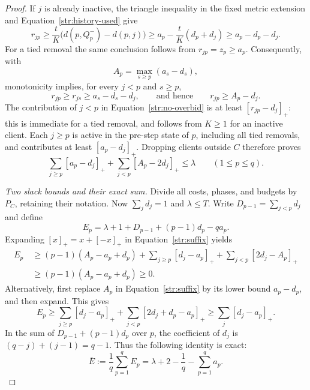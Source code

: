 \begin{proof}
If $j$ is already inactive, the triangle inequality in the fixed metric
extension and Equation~\eqref{str:history-used} give
\[
 r_{jp}\ge \frac{t}{K}\bigl(d(p,Q_p^-)-d(p,j)\bigr)
 \ge a_p-\frac{t}{K}(d_p+d_j)
 \ge a_p-d_p-d_j.
\]
For a tied removal the same conclusion follows from $r_{jp}=z_p\ge a_p$.
Consequently, with
\[
 A_p=\max_{s\ge p}(a_s-d_s),
\]
monotonicity implies, for every $j<p$ and $s\ge p$,
\[
 r_{jp}\ge r_{js}\ge a_s-d_s-d_j,
 \qquad\text{and hence}\qquad r_{jp}\ge A_p-d_j.
\]
The contribution of $j<p$ in Equation~\eqref{str:no-overbid} is at least
$[r_{jp}-d_j]_+$: this is immediate for a tied removal, and follows
from $K\ge1$ for an inactive client.  Each $j\ge p$ is active in the
pre-step state of $p$, including all tied removals, and contributes at
least $[a_p-d_j]_+$.  Dropping clients outside $C$ therefore proves
\begin{equation}\label{str:suffix}
 \sum_{j\ge p}[a_p-d_j]_+
 +\sum_{j<p}[A_p-2d_j]_+\le\lambda
 \qquad(1\le p\le q).
\end{equation}

\textit{Two slack bounds and their exact sum.}
Divide all costs, phases, and budgets by $P_C$, retaining their notation.
Now $\sum_jd_j=1$ and $\lambda\le T$.  Write
$D_{p-1}=\sum_{j<p}d_j$ and define
\begin{equation}\label{str:slack-definition}
 E_p=\lambda+1+D_{p-1}+(p-1)d_p-qa_p.
\end{equation}
Expanding $[x]_+=x+[-x]_+$ in Equation~\eqref{str:suffix} yields
\begin{align}
 E_p\ &\ge (p-1)(A_p-a_p+d_p)
       +\sum_{j\ge p}[d_j-a_p]_+
       +\sum_{j<p}[2d_j-A_p]_+ \\
 &\ge (p-1)(A_p-a_p+d_p)\ge0.
 \label{str:slack-envelope}
\end{align}
Alternatively, first replace $A_p$ in Equation~\eqref{str:suffix} by
its lower bound $a_p-d_p$, and then expand.  This gives
\begin{equation}\label{str:slack-truncation}
 E_p\ge\sum_{j\ge p}[d_j-a_p]_+
           +\sum_{j<p}[2d_j+d_p-a_p]_+
      \ge\sum_j[d_j-a_p]_+.
\end{equation}
In the sum of $D_{p-1}+(p-1)d_p$ over $p$, the coefficient of $d_j$
is $(q-j)+(j-1)=q-1$.  Thus the following identity is exact:
\begin{equation}\label{str:slack-identity}
 \overline E:=\frac1q\sum_{p=1}^qE_p
  =\lambda+2-\frac1q-\sum_{p=1}^qa_p.
\end{equation}


\end{proof}
